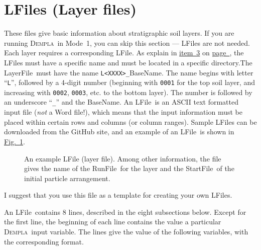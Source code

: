 \documentclass[letterpaper,11pt]{article}
\newcommand{\Dempla}{\textsc{Dempla}}
\newcommand{\Var}[2]{\texttt{#1}\ \  (\texttt{#2})}
\newcommand{\RunFile}{\textsf{RunFile}}
\newcommand{\StartFile}{\textsf{StartFile}}
\newcommand{\BaseName}{\textsf{BaseName}}
\newcommand{\LayerFile}{\textsf{LayerFile}}
\newcommand{\LFile}{\textsf{LFile}}
\begin{document}
\section{LFiles (Layer files)}\label{sec:LFiles}
These files give basic information about stratigraphic
soil layers.
If you are running \Dempla\ in Mode~1,
you can skip this section --- \LFile s are not needed.
Each layer requires a corresponding \LFile.
As explain in
\hyperref[sec:Lfiles0]{item~3} on
\hyperref[sec:Lfiles0]{page~\pageref*{sec:Lfiles0}},
the \LFile s must have a specific name and must be located
in a specific directory.The \LayerFile\ must have the name
\texttt{L<XXXX>\_}\BaseName.
The name begins with letter ``\texttt{L}'',
followed by a 4-digit number
(beginning with \texttt{0001} for the top soil layer,
and increasing with \texttt{0002}, \texttt{0003}, etc.
to the bottom layer).
The number is followed by an underscore ``\texttt{\_}''
and the \BaseName.
%
An \LFile\ is an ASCII text formatted input file
(\emph{not} a Word file!),
which means that
the input information must be placed within certain rows
and columns (or column ranges).
Sample \LFile s can be 
downloaded from the GitHub site,
and an example of an \LFile\ is shown in
\hyperref[fig:LFile]{Fig.~\ref*{fig:LFile}}.
%
%
\begin{figure}
	\centering\footnotesize
	
	\caption{An example \textsf{LFile} (layer file).
	Among other information, the file gives the name
    of the \RunFile\ for the layer and the \StartFile\ of
    the initial particle arrangement.}
	\label{fig:LFile}
\end{figure}
%
%	
%
I suggest that you use this file as a template for creating your
own \LFile s.
%
\par
An \LFile\ contains 8 lines, described in the eight subsections
below.
Except for the first line, the beginning of each line contains
the value a particular \Dempla\ input variable.
The lines give the value of the following variables,
with the corresponding format.
%
%
\end{document}
